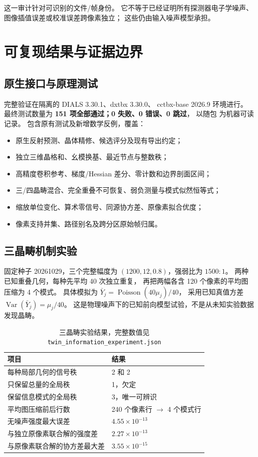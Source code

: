 \documentclass[UTF8,11pt,a4paper,fontset=fandol]{ctexart}
\newcommand{\Var}{\operatorname{Var}}
\newcommand{\TestCount}{151 项全部通过；0 失败、0 错误、0 跳过}
\begin{document}
这一审计针对可识别的文件/帧身份。
它不等于已经证明所有探测器电子学噪声、图像插值误差或校准误差跨像素独立；
这些仍由输入噪声模型承担。

\section{可复现结果与证据边界}

\subsection{原生接口与原理测试}

完整验证在隔离的 DIALS 3.30.1、dxtbx 3.30.0、
cctbx-base 2026.9 环境进行。最终测试数量为 \textbf{\TestCount}，
以随包  为机器可读记录。
包含原有测试及新增数学反例，覆盖：

\begin{itemize}
\item 原生反射预测、晶体精修、候选评分及现有导出约定；
\item 独立三维晶格和、幺模换基、最近节点与整数秩；
\item 高精度卷积参考、梯度/Hessian 差分、零计数和边界剖面区间；
\item 三/四晶畴混合、完全重叠不可恢复、弱负测量与模式似然恒等式；
\item 缩放单位变化、算术零信号、同源协方差、原像素拟合优度；
\item 像素支持并集、路径别名及跨分区原始帧归属。
\end{itemize}

\subsection{三晶畴机制实验}

固定种子 20261029，三个完整幅度为
$(1200,12,0.8)$，强弱比为 $1500{:}1$。
两种已知重叠几何，每种先平均 40 次独立重复，
再把两幅各含 120 个像素的平均图压缩为 4 个模式。
具体模拟为 $\bar Y_j=\operatorname{Poisson}(40\mu_j)/40$，
采用已知真值方差 $\Var(\bar Y_j)=\mu_j/40$。
这是物理噪声下的已知前向模型试验，不是从未知实验数据发现晶畴。

\begin{table}[htbp]
\centering\small
\caption{三晶畴实验结果，完整数值见 \texttt{twin\_information\_experiment.json}}
\begin{tabularx}{\textwidth}{@{}lX@{}}
\toprule
项目 & 结果\\
\midrule
每种局部几何的信号秩 & 2 和 2\\
只保留总量的全局秩 & 1，欠定\\
保留信息模式的全局秩 & 3，唯一可辨识\\
平均图压缩前后行数 & 240 个像素行 $\rightarrow$ 4 个模式行\\
无噪声强度最大误差 & $4.55\times10^{-13}$\\
与独立原像素联合解的强度差 & $2.27\times10^{-13}$\\
与原像素联合解的协方差最大差 & $3.55\times10^{-15}$\\
\bottomrule
\end{tabularx}
\end{table}
\end{document}
